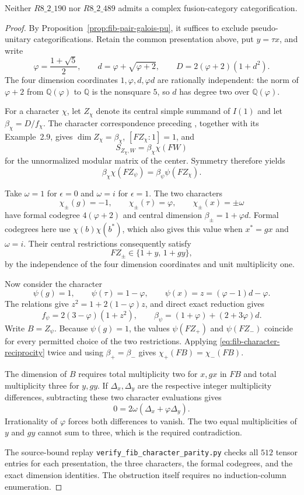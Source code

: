\begin{theorem}\label{thm:fib-character-parity}
Neither $R8\_2\_190$ nor $R8\_2\_489$ admits a complex
fusion-category categorification.
\end{theorem}
\begin{proof}
By Proposition~\ref{prop:fib-pair-galois-pu}, it suffices to
exclude pseudo-unitary categorifications. Retain the common
presentation above, put $y=\tau x$, and write
\[
\varphi=\frac{1+\sqrt5}{2},\qquad
 d=\varphi+\sqrt{\varphi+2},\qquad
 D=2(\varphi+2)(1+d^2).
\]
The four dimension coordinates $1,\varphi,d,\varphi d$ are
rationally independent: the norm of $\varphi+2$ from
$\mathbb Q(\varphi)$ to $\mathbb Q$ is the nonsquare $5$,
so $d$ has degree two over $\mathbb Q(\varphi)$.

For a character $\chi$, let $Z_\chi$ denote its central simple
summand of $I(1)$ and let $\beta_\chi=D/f_\chi$.
The character correspondence preceding
\cite[Theorem~2.13]{OstrikPiv3}, together with its Example~2.9,
gives $\dim Z_\chi=\beta_\chi$, $[FZ_\chi:1]=1$, and
\[
S_{Z_\chi,W}=\beta_\chi\chi(FW)
\]
for the unnormalized modular matrix of the center. Symmetry
therefore yields
\begin{equation}\label{eq:fib-character-reciprocity}
\beta_\chi\chi(FZ_\psi)=\beta_\psi\psi(FZ_\chi).
\end{equation}

Take $\omega=1$ for $\epsilon=0$ and $\omega=i$ for
$\epsilon=1$. The two characters
\[
\chi_\pm(g)=-1,\qquad \chi_\pm(\tau)=\varphi,
\qquad \chi_\pm(x)=\pm\omega
\]
have formal codegree $4(\varphi+2)$ and central dimension
$\beta_\pm=1+\varphi d$. Formal codegrees here use
$\chi(b)\chi(b^*)$, which also gives this value when
$x^*=gx$ and $\omega=i$. Their central restrictions consequently
satisfy
\[
 FZ_\pm\in\{1+y,\,1+gy\},
\]
by the independence of the four dimension coordinates and unit
multiplicity one.

Now consider the character
\[
\psi(g)=1,\qquad \psi(\tau)=1-\varphi,
\qquad \psi(x)=z=(\varphi-1)d-\varphi.
\]
The relations give $z^2=1+2(1-\varphi)z$, and direct exact
reduction gives
\[
f_\psi=2(3-\varphi)(1+z^2),\qquad
\beta_\psi=(1+\varphi)+(2+3\varphi)d.
\]
Write $B=Z_\psi$. Because $\psi(g)=1$, the values
$\psi(FZ_+)$ and $\psi(FZ_-)$ coincide for every permitted
choice of the two restrictions. Applying
\eqref{eq:fib-character-reciprocity} twice and using
$\beta_+=\beta_-$ gives $\chi_+(FB)=\chi_-(FB)$.

The dimension of $B$ requires total multiplicity two for
$x,gx$ in $FB$ and total multiplicity three for $y,gy$.
If $\Delta_x,\Delta_y$ are the respective integer multiplicity
differences, subtracting these two character evaluations gives
\[
0=2\omega(\Delta_x+\varphi\Delta_y).
\]
Irrationality of $\varphi$ forces both differences to vanish.
The two equal multiplicities of $y$ and $gy$ cannot sum to three,
which is the required contradiction.

The source-bound replay
\texttt{verify\_fib\_character\_parity.py} checks all $512$
tensor entries for each presentation, the three characters,
the formal codegrees, and the exact dimension identities.
The obstruction itself requires no induction-column enumeration.
\end{proof}





